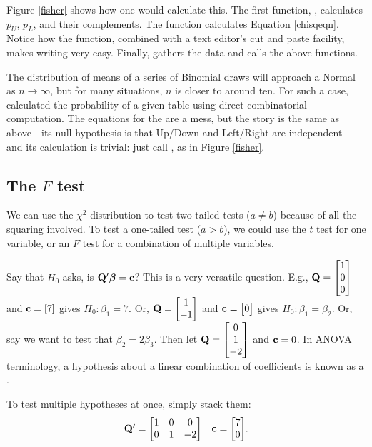 Figure \ref{fisher} shows how one would calculate this. The first
function, , calculates $p_U$, $p_L$, and their
complements. The  function calculates Equation
\ref{chisqeqn}. Notice how the  function, combined with
a text editor's cut and paste facility, makes writing  very easy.
Finally,  gathers the data and calls the above functions.

The distribution of means of a series of Binomial draws will approach a Normal 
as $n\to \infty$, but for many situations, $n$ is closer to around ten.
For such a case, \citet{fisher:exact} calculated the probability of a
given table using direct combinatorial computation. The equations for
the  are a mess, but the story is the same
as above---its null hypothesis is that Up/Down and Left/Right
are independent---and its calculation is trivial: just call
, as in Figure \ref{fisher}.




\subsection{The $F$ test}\label{ftestsec}
We can use the $\chi^2$ distribution to test two-tailed
tests ($a \neq b$) because of all the squaring involved. To test a
one-tailed test ($a > b$), we could use the $t$ test for one variable,
or an $F$ test for a combination of multiple variables.

Say that $H_0$ asks, is ${{\bf Q}'
{\mbox{\boldmath$\beta$}}} = {\bf c}$?  This is a very versatile question. E.g., ${\bf Q} =
\left[\begin{matrix}1\cr 0\cr 0\end{matrix}\right]$ and ${\bf c} = [7]$ gives $H_0: \beta_1 = 7$. Or, ${\bf Q} = \left[\begin{matrix}1 \cr
-1\end{matrix}\right]$ and ${\bf c} = \left[\begin{matrix}0\end{matrix}\right]$ gives $H_0: \beta_1=\beta_2$. 
Or, say we want to test that $\beta_2 = 2\beta_3$. Then let ${\bf Q}=\left[\begin{matrix}0 \cr 1 \cr -2\end{matrix}\right]$ and ${\bf c} = 0$. In ANOVA terminology, a hypothesis about a linear combination of coefficients is known as a .

To test multiple hypotheses at once, simply stack them:
\begin{equation}
\begin{matrix}{\bf Q}' = \left[\begin{matrix}1 & 0 & 0  \cr
                0 &1 &-2\end{matrix}\right] 
                & {\bf c} = \left[\begin{matrix}7 \cr 0\end{matrix}\right]\end{matrix}.\label{qc}\end{equation}

